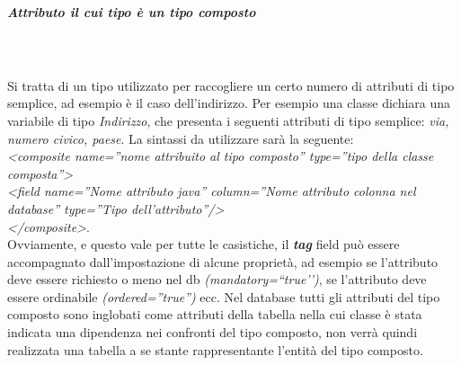 \subparagraph{Attributo il cui tipo \`{e} un tipo composto} \quad \quad \\ \\
Si tratta di un tipo utilizzato per raccogliere un certo numero di attributi di tipo semplice, ad esempio \`{e} il caso dell\textquoteright{}indirizzo. Per esempio una classe dichiara una variabile di tipo \textit{Indirizzo}, che presenta i seguenti attributi di tipo semplice: \textit{via, numero civico, paese}.
La sintassi da utilizzare sar\`{a} la seguente:\\
\textit{<composite name=''nome attribuito al tipo composto'' type=''tipo della classe composta''>} \\
\textit{<field name=''Nome attributo java'' column=''Nome attributo colonna nel database'' type=''Tipo dell\textquoteright{}attributo''/>} \\
\textit{</composite>}.\\
Ovviamente, e questo vale per tutte le casistiche, il \textit{\textbf{tag}} field pu\`{o} essere accompagnato dall\textquoteright{}impostazione di alcune propriet\`{a}, ad esempio se l\textquoteright{}attributo deve essere richiesto o meno nel db \textit{(mandatory=``true\textquoteright{}\textquoteright{})}, se l\textquoteright{}attributo deve essere ordinabile \textit{(ordered=''true'')} ecc. Nel database tutti gli attributi del tipo composto sono inglobati come attributi della tabella nella cui classe \`{e} stata indicata una dipendenza nei confronti del tipo composto, non verr\`{a} quindi realizzata una tabella a se stante rappresentante l\textquoteright{}entit\`{a} del tipo composto.

